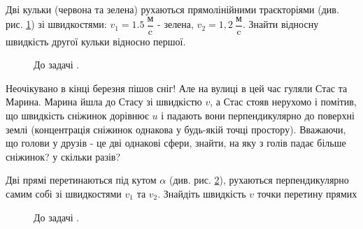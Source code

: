 \begin{problem}{\label{balls}}
	Дві кульки (червона та зелена) рухаються прямолінійними траєкторіями (див. рис. \ref{2_balls}) зі швидкостями: $v_1 = 1.5 ~\dfrac{\text{м}}{\text{c}}$ - зелена, $v_2 = 1,2~\dfrac{\text{м}}{\text{c}}$. Знайти відносну швидкість другої кульки відносно першої.
	\begin{figure}[h!]
		\centering
		\caption{До задачі .}
		\label{2_balls}
	\end{figure}
	
\end{problem}

\begin{problem}{2}
	Неочікувано в кінці березня пішов сніг! Але на вулиці в цей час гуляли Стас та Марина. Марина йшла до Стасу зі швидкістю $v$, а Стас стояв нерухомо і помітив, що швидкість сніжинок дорівнює $u$ і падають вони перпендикулярно до поверхні землі (концентрація сніжинок однакова у будь-якій точці простору). Вважаючи, що голови у друзів - це дві однакові сфери, знайти, на яку з голів падає більше сніжинок? у скільки разів?
\end{problem}

\begin{problem}{\label{2_lines}}
	Дві прямі перетинаються під кутом $\alpha$ (див. рис. \ref{to_2_lines}), рухаються перпендикулярно самим собі зі швидкостями $v_1$ та $v_2$. Знайдіть швидкість $v$ точки перетину прямих
	
	\begin{figure}[h!]
		\centering
		
		\caption{До задачі .}
		\label{to_2_lines}
	\end{figure}
\end{problem}

